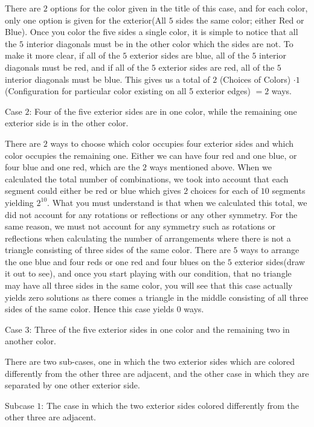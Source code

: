\begin{enumerate}
 There are $2$ options for the color given in the title of this case, and for each color, only one option is given for the exterior(All $5$ sides the same color; either Red or Blue). Once you color the five sides a single color, it is simple to notice that all the $5$ interior diagonals must be in the other color which the sides are not. To make it more clear, if all of the $5$ exterior sides are blue, all of the $5$ interior diagonals must be red, and if all of the $5$ exterior sides are red, all of the $5$ interior diagonals must be blue. This gives us a total of $2$ (Choices of Colors) $\cdot 1$ (Configuration for particular color existing on all 5 exterior edges) $= 2$ ways. 

 Case $2$: Four of the five exterior sides are in one color, while the remaining one exterior side is in the other color.

 There are $2$ ways to choose which color occupies four exterior sides and which color occupies the remaining one. Either we can have four red and one blue, or four blue and one red, which are the $2$ ways mentioned above. When we calculated the total number of combinations, we took into account that each segment could either be red or blue which gives $2$ choices for each of $10$ segments yielding $2^{10}$. What you must understand is that when we calculated this total, we did not account for any rotations or reflections or any other symmetry. For the same reason, we must not account for any symmetry such as rotations or reflections when calculating the number of arrangements where there is not a triangle consisting of three sides of the same color. There are $5$ ways to arrange the one blue and four reds or one red and four blues on the $5$ exterior sides(draw it out to see), and once you start playing with our condition, that no triangle may have all three sides in the same color, you will see that this case actually yields zero solutions as there comes a triangle in the middle consisting of all three sides of the same color. Hence this case yields $0$ ways.

 Case $3$: Three of the five exterior sides in one color and the remaining two in another color. 

 There are two sub-cases, one in which the two exterior sides which are colored differently from the other three are adjacent, and the other case in which they are separated by one other exterior side.

 Subcase $1$: The case in which the two exterior sides colored differently from the other three are adjacent. 


\end{enumerate}
